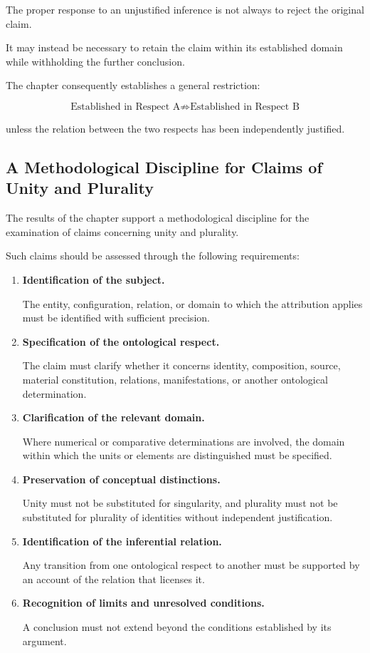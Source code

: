 The proper response to an
unjustified inference is not
always to reject the original
claim.

It may instead be necessary
to retain the claim within
its established domain while
withholding the further conclusion.

The chapter consequently
establishes a general restriction:

\[
\text{Established in Respect A}
\not\Rightarrow
\text{Established in Respect B}
\]

unless the relation between
the two respects has been
independently justified.

\subsection{A Methodological Discipline for Claims of Unity and Plurality}

The results of the chapter
support a methodological
discipline for the examination
of claims concerning unity
and plurality.

Such claims should be assessed
through the following requirements:

\begin{enumerate}
    \item \textbf{Identification of the subject.}

    The entity, configuration,
    relation, or domain to which
    the attribution applies
    must be identified with
    sufficient precision.

    \item \textbf{Specification of the ontological respect.}

    The claim must clarify
    whether it concerns identity,
    composition, source, material
    constitution, relations,
    manifestations, or another
    ontological determination.

    \item \textbf{Clarification of the relevant domain.}

    Where numerical or comparative
    determinations are involved,
    the domain within which
    the units or elements are
    distinguished must be specified.

    \item \textbf{Preservation of conceptual distinctions.}

    Unity must not be substituted
    for singularity, and plurality
    must not be substituted
    for plurality of identities
    without independent justification.

    \item \textbf{Identification of the inferential relation.}

    Any transition from one
    ontological respect to another
    must be supported by an
    account of the relation
    that licenses it.

    \item \textbf{Recognition of limits and unresolved conditions.}

    A conclusion must not extend
    beyond the conditions established
    by its argument.
\end{enumerate}

